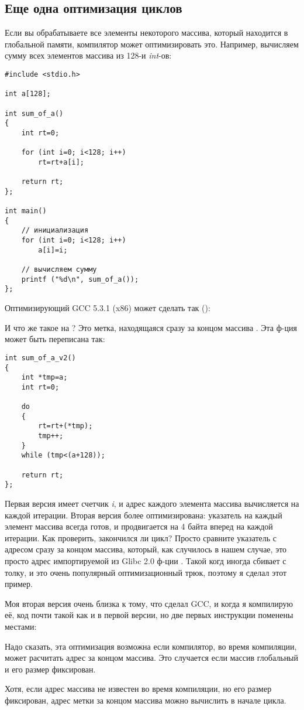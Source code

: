 \subsection{Еще одна оптимизация циклов}

Если вы обрабатываете все элементы некоторого массива, который находится в глобальной памяти, компилятор может оптимизировать
это.
Например, вычисляем сумму всех элементов массива из 128-и \emph{int}-ов:

\begin{lstlisting}[style=customc]
#include <stdio.h>

int a[128];

int sum_of_a()
{
	int rt=0;
	
	for (int i=0; i<128; i++)
		rt=rt+a[i];

	return rt;
};

int main()
{
	// инициализация
	for (int i=0; i<128; i++)
		a[i]=i;
	
	// вычисляем сумму
	printf ("%d\n", sum_of_a());
};
\end{lstlisting}

Оптимизирующий GCC 5.3.1 (x86) может сделать так (\IDA):



И что же такое  на ?
Это метка, находящаяся сразу за концом массива .
Эта ф-ция может быть переписана так:

\begin{lstlisting}[style=customc]
int sum_of_a_v2()
{
	int *tmp=a;
	int rt=0;
	
	do
	{
		rt=rt+(*tmp);
		tmp++;
	}
	while (tmp<(a+128));

	return rt;
};
\end{lstlisting}

Первая версия имеет счетчик \emph{i}, и адрес каждого элемента массива вычисляется на каждой итерации.
Вторая версия более оптимизирована: указатель на каждый элемент массива всегда готов, и продвигается на 4 байта вперед
на каждой итерации.
Как проверить, закончился ли цикл?
Просто сравните указатель с адресом сразу за концом массива, который, как случилось в нашем случае, это просто адрес
импортируемой из Glibc 2.0 ф-ции .
Такой когд иногда сбивает с толку, и это очень популярный оптимизационный трюк, поэтому я сделал этот пример.

Моя вторая версия очень близка к тому, что сделал GCC, и когда я компилирую её, код почти такой как и в первой версии,
но две первых инструкции поменены местами:



Надо сказать, эта оптимизация возможна если компилятор, во время компиляции, может расчитать адрес за концом массива.
Это случается если массив глобальный и его размер фиксирован.

Хотя, если адрес массива не известен во время компиляции, но его размер фиксирован, адрес метки за концом массива
можно вычислить в начале цикла.

